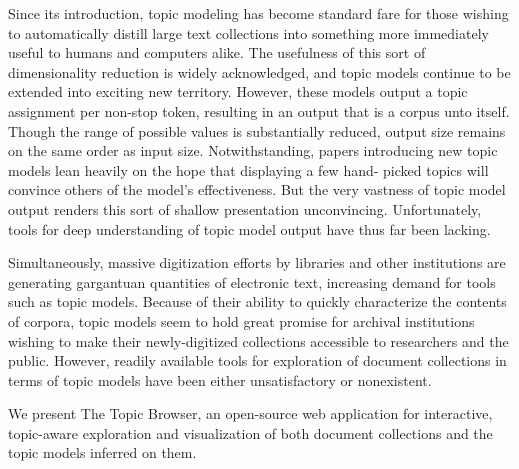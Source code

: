 \documentclass[11pt]{article}
\begin{document}
Since its introduction, topic modeling has become standard fare for those wishing
to automatically distill large text collections into something more immediately
useful to humans and computers alike. The usefulness of this sort of
dimensionality reduction is widely acknowledged, and topic models continue to be
extended into exciting new territory. However, these models
output a topic assignment per non-stop token, resulting in an output that is a
corpus unto itself. Though the range of possible values is substantially reduced,
output size remains on the same order as input size. Notwithstanding, papers
introducing new topic models lean heavily on the hope that displaying a few hand-
picked topics will convince others of the model's effectiveness. But the very
vastness of topic model output renders this sort of shallow presentation
unconvincing. Unfortunately, tools for deep understanding of topic model output
have thus far been lacking.

Simultaneously, massive digitization efforts by libraries and other institutions
are generating gargantuan quantities of electronic text, increasing demand for tools such as
topic models. Because of their ability to quickly characterize the contents of
corpora, topic models seem to hold great promise for archival
institutions wishing to make their newly-digitized collections accessible to
researchers and the public. However, readily available tools for exploration of 
document collections in terms of topic models have been either unsatisfactory
or nonexistent.

We present The Topic Browser, an open-source web application for interactive,
topic-aware exploration and visualization of both document collections and the
topic models inferred on them.
\end{document}
